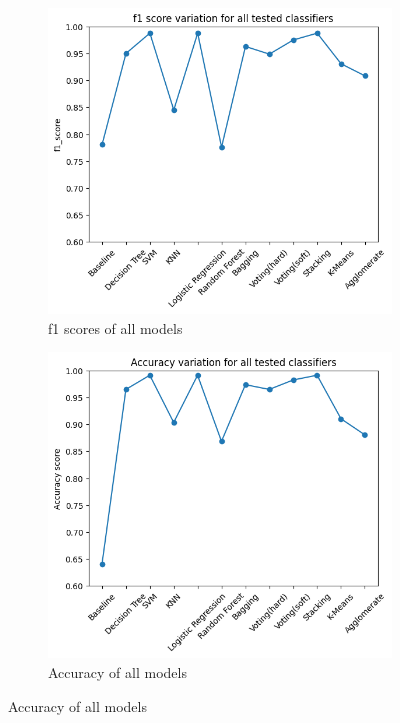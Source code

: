 \documentclass{article}
\begin{document}
\begin{figure}[H]
    \begin{subfigure}[b]{0.45\textwidth}
        \centering
        \includegraphics[width = \textwidth]{Images/f1.png}
        \caption{f1 scores of all models}
        \label{fig:f1}
     \end{subfigure}
     \begin{subfigure}[b]{0.45\textwidth}
        \centering
        \includegraphics[width = \textwidth]{Images/acc.png}
        \caption{Accuracy of all models}
        \label{fig:accuracy}
     \end{subfigure}

\end{figure}
\end{document}
